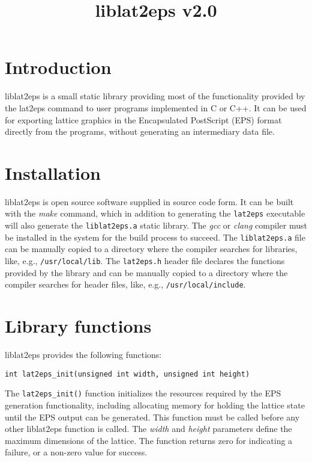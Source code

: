 \documentclass[a4paper]{article}
\title{\vspace{-5ex}liblat2eps v2.0}
\author{}
\date{\vspace{-5ex}}
\begin{document}
\maketitle


\section{Introduction}

liblat2eps is a small static library providing most of the functionality provided by the lat2eps command to user programs implemented in C or C++. It can be used for exporting lattice graphics in the Encapsulated PostScript (EPS) format directly from the programs, without generating an intermediary data file.
\bigbreak

\section{Installation}

liblat2eps is open source software supplied in source code form. It can be built with the \textit{make} command, which in addition to generating the \texttt{lat2eps} executable will also generate the \texttt{liblat2eps.a} static library. The \textit{gcc} or \textit{clang} compiler must be installed in the system for the build process to succeed. The \texttt{liblat2eps.a} file can be manually copied to a directory where the compiler searches for libraries, like, e.g., \texttt{/usr/local/lib}. The \texttt{lat2eps.h} header file declares the functions provided by the library and can be manually copied to a directory where the compiler searches for header files, like, e.g., \texttt{/usr/local/include}.
\bigbreak


\section{Library functions}

liblat2eps provides the following functions:
\bigbreak\bigbreak

\texttt{int lat2eps\_init(unsigned int width, unsigned int height)}
\bigbreak

The \texttt{lat2eps\_init()} function initializes the resources required by the EPS generation functionality, including allocating memory for holding the lattice state until the EPS output can be generated. This function must be called before any other liblat2eps function is called. The \textit{width} and \textit{height} parameters define the maximum dimensions of the lattice. The function returns zero for indicating a failure, or a non-zero value for success.
\bigbreak\bigbreak
\end{document}
